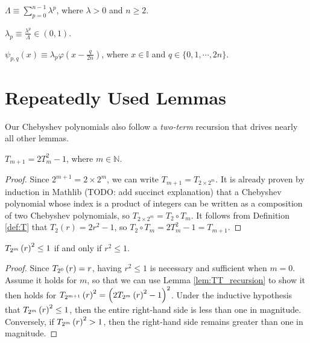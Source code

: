 \begin{definition}[Normalizer]
  \label{def:Lambda}
  $\Lambda \equiv \sum\limits_{p = 0}^{n - 1} \lambda^p$, where $\lambda > 0$ and $n \geq 2$.
\end{definition}
\begin{definition}
  \label{def:lambda_p}
  $\lambda_p \equiv \frac{\lambda^p}{\Lambda} \in \left(0,1\right)$.
\end{definition}
\begin{definition}
  \label{def:inner_function}
  $\psi_{p,q}\left(x\right) \equiv \lambda_p \varphi\left(x - \frac{q}{2n}\right)$, where $x \in \mathbb{I}$ and $q \in \{0, 1, \cdots, 2n\}$.
\end{definition}

\section{Repeatedly Used Lemmas}\label{sec:RepeatedlyUsedLemmas}

\renewcommand{\thetheorem}{\Alph{theorem}}

Our Chebyshev polynomials also follow a \emph{two-term} recursion that drives nearly all other lemmas.
\begin{lemma}
  \label{lem:TT_recursion}
  \leanok
  $T_{m + 1} = 2T_{m}^2 - 1$, where $m \in \mathbb{N}$.
\end{lemma}
  
\begin{proof}
  \leanok
  Since $2^{m + 1} = 2 \times 2^m$, we can write $T_{m + 1} = T_{2 \times 2^m}$. It is already proven by induction in Mathlib (TODO: add succinct explanation) that a Chebyshev polynomial whose index is a product of integers can be written as a composition of two Chebyshev polynomials, so $T_{2 \times 2^m} = T_2 \circ T_{m}$. It follows from Definition \ref{def:T} that $T_2\left(r\right) = 2r^2 - 1$, so $T_2 \circ T_{m} = 2T_{m}^2 - 1 = T_{m + 1}$.
\end{proof}

\begin{lemma}[Bounds]
  \label{lem:bounds}
  $\TT[r]{m}^2 \leq 1$ if and only if $r^2 \leq 1$.
\end{lemma}
\begin{proof}
  Since $\TT[r]{0} = r$, having $r^2 \leq 1$ is necessary and sufficient when $m = 0$. Assume it holds for $m$, so that we can use Lemma \ref{lem:TT_recursion} to show it then holds for $\TT[r]{m + 1}^2 = \left(2\TT[r]{m}^2 - 1\right)^2$. Under the inductive hypothesis that $\TT[r]{m}^2 \leq 1$, then the entire right-hand side is less than one in magnitude. Conversely, if $\TT[r]{m}^2 > 1$, then the right-hand side remains greater than one in magnitude.
\end{proof}

